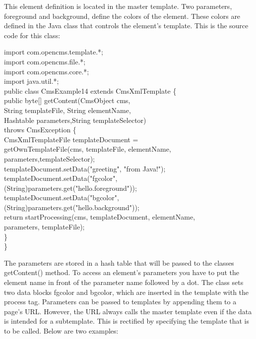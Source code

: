 \begin{java}
This element definition is located in the master template. Two
parameters, {\name foreground} and {\name background,} define the colors of the
element. These colors are defined in the Java class that controls the
element's template. This is the source code for this class:

import com.opencms.template.*;\\
import com.opencms.file.*;\\
import com.opencms.core.*;\\

import java.util.*;\\
public class CmsExample14 extends CmsXmlTemplate \{\\
public byte[] getContent(CmsObject cms, \\
\jtabd        String templateFile, String elementName,\\
\jtabd        Hashtable parameters,String templateSelector)\\
\jtabd        throws CmsException \{\\
\jtabd        CmsXmlTemplateFile templateDocument =\\
\jtabd        getOwnTemplateFile(cms, templateFile, elementName,\\
\jtabe                           parameters,templateSelector);\\
\jtabb    templateDocument.setData("greeting", "from Java!");\\
\jtabb    templateDocument.setData("fgcolor",\\
\jtabd        (String)parameters.get("hello.foreground"));\\
\jtabb    templateDocument.setData("bgcolor",\\
\jtabd        (String)parameters.get("hello.background"));\\
\jtabb    return startProcessing(cms, templateDocument, elementName,\\
\jtabd        parameters, templateFile);\\
\jtabb    \}\\
\}\\
\end{java}

The parameters are stored in a hash table that will be passed to the
classes {\meth getContent()} method. To access an element's parameters you have
to put the element name in front of the parameter name followed by a
dot. The class sets two data blocks {\name fgcolor} and {\name bgcolor,} which are
inserted in the template with the process tag.
Parameters can be passed to templates by appending them to a page's URL.
However, the URL always calls the master template even if the data is
intended for a subtemplate. This is rectified by specifying the template
that is to be called. Below are two examples:

